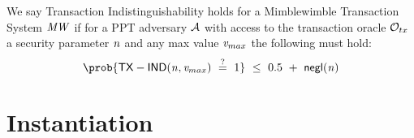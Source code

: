 \begin{center}
\end{center}

\begin{definition} \label{def:atom:tx-indisting}
    We say Transaction Indistinguishability holds for a Mimblewimble Transaction System $\mathit{MW}$ if for a PPT adversary $\mathcal{A}$ with access to the transaction oracle $\mathcal{O}_{tx}$ a
    security parameter $\mathit{n}$ and any max value $\mathit{v}_{max}$ the following must hold:
    \[ \prob{\procTxInd{\varN}{\varValueMax} \opEq 1} \opSmEq 0.5 \opAddScalar \funNegl{\varN} \]
\end{definition}


\section{Instantiation}\label{sec:atom:atomic-inst}

